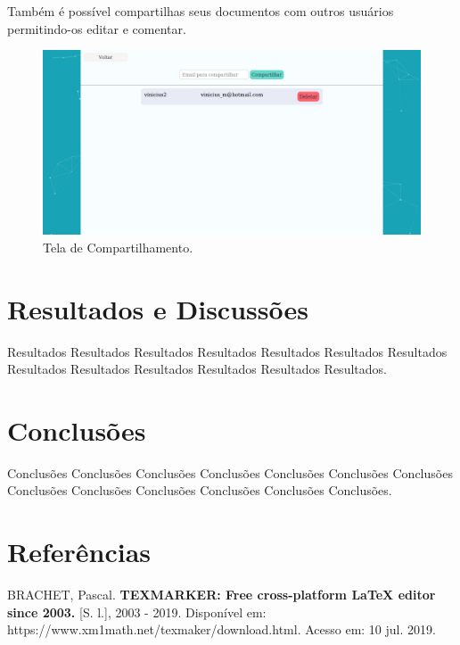 \documentclass[article,12pt,oneside,a4paper,english,brazil,sumario=tradicional]{abntex2}
\begin{document}
Também é possível compartilhas seus documentos com outros usuários permitindo-os editar e comentar.


  \begin{figure}[H]
    \centering
    \caption{Tela de Compartilhamento.}
    \includegraphics[width=16cm]{figures/Tela Compartilhar Projeto - FATEX.jpeg}
  \end{figure}






\section{Resultados e Discussões}

Resultados Resultados Resultados Resultados Resultados Resultados Resultados Resultados Resultados Resultados Resultados Resultados Resultados.





\section{Conclusões}

Conclusões Conclusões Conclusões Conclusões Conclusões Conclusões Conclusões Conclusões Conclusões Conclusões Conclusões Conclusões Conclusões.





\section{Referências}
\raggedright


BRACHET, Pascal. \textbf{TEXMARKER: Free cross-platform LaTeX editor since 2003.} [S. l.], 2003 - 2019. Disponível em: https://www.xm1math.net/texmaker/download.html. Acesso em: 10 jul. 2019.
\end{document}
